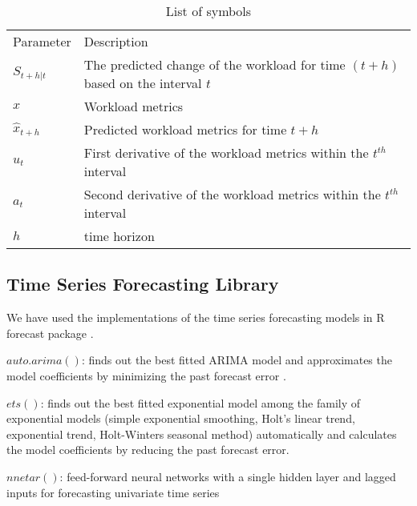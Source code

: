 \begin{table}[]
\centering
\caption{List of symbols}
\label{my-label}
\begin{tabular}{ll}
Parameter       & Description                                                                     \\
$S_{t+h|t}$     & The predicted change of the workload for time $(t+h)$ based on the interval $t$ \\
$x$             & Workload metrics                                                                \\
$\hat{x}_{t+h}$ & Predicted workload metrics for time $t+h$                                       \\
$u_{t}$         & First derivative of the workload metrics within the $t^{th}$ interval           \\
$a_{t}$         & Second derivative of the workload metrics within the $t^{th}$ interval          \\
$h$             & time horizon                                                                   
\end{tabular}
\end{table}


\subsection{Time Series Forecasting Library}

We have used the implementations of the time series forecasting models in R forecast package  \cite{forecastPackage}.

$auto.arima()$:  finds out the best fitted ARIMA model and approximates the model coefficients by minimizing the past forecast error \cite{Forecasting_OTexts}.

$ets()$: finds out the best fitted exponential model among the family of exponential models (simple exponential smoothing, Holt's linear trend, exponential trend, Holt-Winters seasonal method) automatically and calculates the model coefficients by reducing the past forecast error. \cite{Forecasting_OTexts}
    
$nnetar()$: feed-forward neural networks with a single hidden layer and lagged inputs for forecasting univariate time series